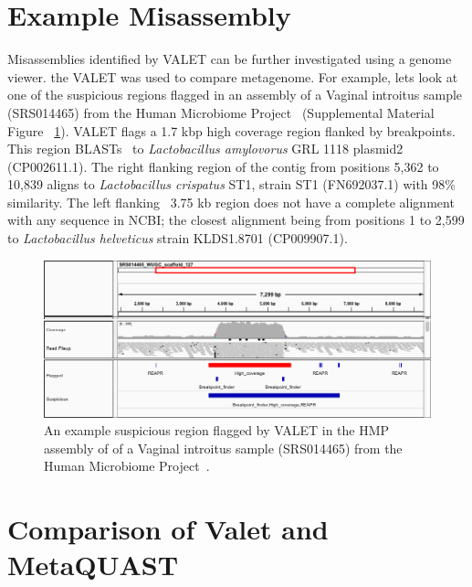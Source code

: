 \documentclass{article}
\begin{document}
\section{Example Misassembly}
Misassemblies identified by VALET can be further investigated using a genome viewer. the VALET was used to compare metagenome. 
For example, lets look at one of the suspicious regions flagged in an assembly of a Vaginal introitus sample (SRS014465) from the Human Microbiome Project~\citep{human2012structure} (Supplemental Material Figure ~\ref{fig:hmp_plasmid}).
VALET flags a 1.7 kbp high coverage region flanked by breakpoints.
This region BLASTs~\citep{BLAST} to \emph{Lactobacillus amylovorus} GRL 1118 plasmid2 (CP002611.1).
The right flanking region of the contig from positions 5,362 to 10,839 aligns to \emph{Lactobacillus crispatus} ST1, strain ST1 (FN692037.1) with 98\% similarity.
The left flanking ~3.75 kb region does not have a complete alignment with any sequence in NCBI; the closest alignment being from positions 1 to 2,599 to \emph{Lactobacillus helveticus} strain KLDS1.8701 (CP009907.1).

\begin{figure}
\begin{center}
\includegraphics[width=\textwidth]{figures/hmp_plasmid}
\end{center}
\caption[hmp_plasmid]{An example suspicious region flagged by VALET in the HMP assembly of of a Vaginal introitus sample (SRS014465) from the Human Microbiome Project~\citep{human2012structure}.}
\label{fig:hmp_plasmid}
\end{figure}


\section{Comparison of Valet and MetaQUAST}
\end{document}
